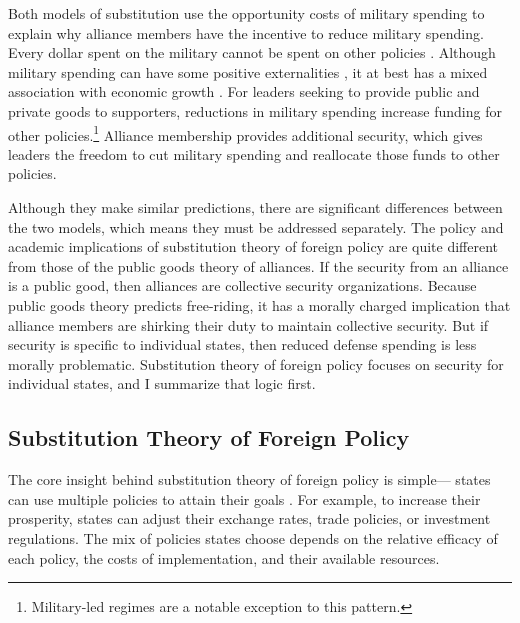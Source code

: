 \documentclass[12pt]{article}
\begin{document}
Both models of substitution use the opportunity costs of military spending to explain why alliance members have the incentive to reduce military spending. 
Every dollar spent on the military cannot be spent on other policies \citep{Powell1993, JacksonMorelli2008, Fearon2018}. 
Although military spending can have some positive externalities \citep{WhittenWilliams2011}, it at best has a mixed association with economic growth \citep{DegerSen1995, ShinWard1999, ScanlanJenkins2001, AlptekinLevine2012}. 
For leaders seeking to provide public and private goods to supporters, reductions in military spending increase funding for other policies.\footnote{Military-led regimes are a notable exception to this pattern.} 
Alliance membership provides additional security, which gives leaders the freedom to cut military spending and reallocate those funds to other policies. 


Although they make similar predictions, there are significant differences between the two models, which means they must be addressed separately.
The policy and academic implications of substitution theory of foreign policy are quite different from those of the public goods theory of alliances. 
If the security from an alliance is a public good, then alliances are collective security organizations. 
Because public goods theory predicts free-riding, it has a morally charged implication that alliance members are shirking their duty to maintain collective security. 
But if security is specific to individual states, then reduced defense spending is less morally problematic.
Substitution theory of foreign policy focuses on security for individual states, and I summarize that logic first. 



\subsection{Substitution Theory of Foreign Policy}

The core insight behind substitution theory of foreign policy is simple--- states can use multiple policies to attain their goals \citep{MostStarr1989}. 
For example, to increase their prosperity, states can adjust their exchange rates, trade policies, or investment regulations. 
The mix of policies states choose depends on the relative efficacy of each policy, the costs of implementation, and their available resources. 
\end{document}

